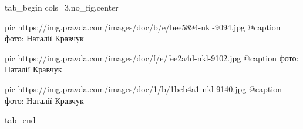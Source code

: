  
 
 
 
 


\ifcmt
  tab_begin cols=3,no_fig,center

     pic https://img.pravda.com/images/doc/b/e/bee5894-nkl-9094.jpg
		 @caption фото: Наталії Кравчук

		 pic https://img.pravda.com/images/doc/f/e/fee2a4d-nkl-9102.jpg
		 @caption фото: Наталії Кравчук

		 pic https://img.pravda.com/images/doc/1/b/1bcb4a1-nkl-9140.jpg
		 @caption фото: Наталії Кравчук

  tab_end
\fi
